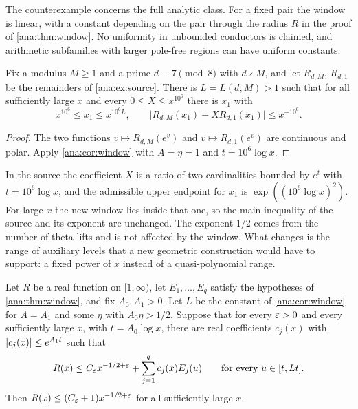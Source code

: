 The counterexample concerns the full analytic class. For a fixed pair the window is linear,
with a constant depending on the pair through the radius $R$ in the proof of
\cref{ana:thm:window}. No uniformity in unbounded conductors is claimed, and arithmetic
subfamilies with larger pole-free regions can have uniform constants.

\begin{corollary}\label{ana:cor:source}
Fix a modulus $M\ge1$ and a prime $d\equiv7\pmod8$ with $d\nmid M$, and let $R_{d,M}$, $R_{d,1}$
be the remainders of \cref{ana:ex:source}. There is $L=L(d,M)>1$ such that for all
sufficiently large $x$ and every $0\le X\le x^{10^6}$ there is $x_1$ with
\[
 x^{10^6}\le x_1\le x^{10^6L},\qquad
 \bigl|R_{d,M}(x_1)-XR_{d,1}(x_1)\bigr|\le x^{-10^6}.
\]
\end{corollary}

\begin{proof}
The two functions $v\mapsto R_{d,M}(e^v)$ and $v\mapsto R_{d,1}(e^v)$ are continuous and polar.
Apply \cref{ana:cor:window} with $A=\eta=1$ and $t=10^6\log x$.
\end{proof}

In the source the coefficient $X$ is a ratio of two cardinalities bounded by $e^t$ with
$t=10^6\log x$, and the admissible upper endpoint for $x_1$ is $\exp((10^6\log x)^2)$. For
large $x$ the new window lies inside that one, so the main inequality of the source and its
exponent are unchanged. The exponent $1/2$ comes from the number of theta lifts and is not
affected by the window. What changes is the range of auxiliary levels that a new geometric
construction would have to support: a fixed power of $x$ instead of a quasi-polynomial range.

\begin{corollary}\label{ana:cor:interface}
Let $R$ be a real function on $[1,\infty)$, let $E_1,\dots,E_q$ satisfy the hypotheses of
\cref{ana:thm:window}, and fix $A_0,A_1>0$. Let $L$ be the constant of \cref{ana:cor:window} for
$A=A_1$ and some $\eta$ with $A_0\eta>1/2$. Suppose that for every $\varepsilon>0$ and every
sufficiently large $x$, with $t=A_0\log x$, there are real coefficients $c_j(x)$ with
$\lvert c_j(x)\rvert\le e^{A_1t}$ such that
\begin{equation}\label{ana:eq:interface}
 R(x)\le C_\varepsilon x^{-1/2+\varepsilon}+\sum_{j=1}^qc_j(x)E_j(u)\qquad\text{for every }u\in[t,Lt].
\end{equation}
Then $R(x)\le(C_\varepsilon+1)x^{-1/2+\varepsilon}$ for all sufficiently large $x$.
\end{corollary}

